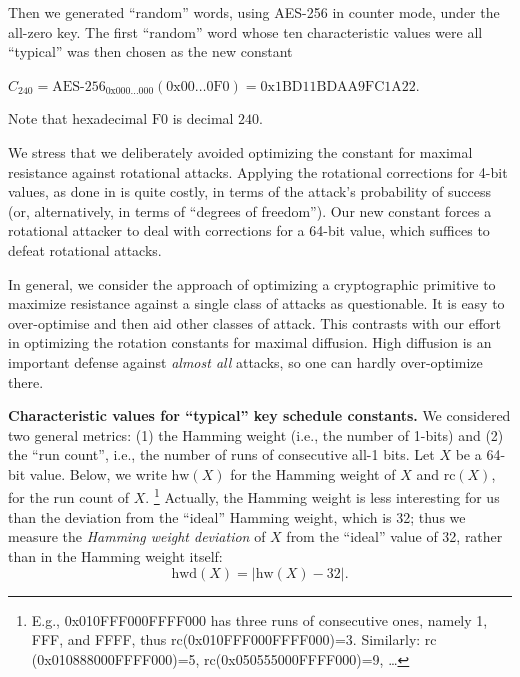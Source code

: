\documentclass[11pt,twoside]{article}
\newcommand{\TheConst}{C_{240}} %
\begin{document}
Then we generated ``random'' words, using AES-256 in counter
mode, under the all-zero key. The first ``random'' word whose ten 
characteristic values were all 
``typical'' was then chosen as the new constant
\begin{center}
  $\TheConst=\text{AES-256}_{\text{0x000\ldots000}}(\text{0x00\ldots0F0})
            =\text{0x1BD11BDAA9FC1A22}$. 
\end{center}
Note that hexadecimal $\text{F0}$ is decimal $240$. 

We stress that we deliberately avoided optimizing the constant for maximal
resistance against rotational attacks. Applying the rotational corrections for
4-bit values, as done in \cite{KN10,RKN10} is quite costly, in terms of the
attack's probability of success (or, alternatively, in terms of ``degrees of
freedom''). Our new constant forces a rotational attacker to deal with 
corrections for a 64-bit value, which suffices to defeat rotational
attacks. 

In general, we consider the approach of optimizing a cryptographic
primitive to maximize resistance against a single class of attacks as
questionable. It is easy to over-optimise and then aid other
classes of attack.
This contrasts with our effort in optimizing the rotation constants for 
maximal diffusion. High diffusion is an important defense against 
\emph{almost all} attacks, so one can hardly over-optimize there.

{\bf Characteristic values for ``typical'' key schedule constants.}
We considered two general metrics: 
(1) the Hamming weight (i.e., the number of 1-bits) and
(2) the ``run count'', i.e., the number of runs of consecutive all-1 bits. 
Let $X$ be a 64-bit value. Below, we write $\mbox{hw}(X)$ for the Hamming
weight of $X$ and $\mbox{rc}(X)$, for the run count of $X$.%
    \footnote{E.g.,    0x010FFF000FFFF000 has three runs of consecutive ones,
      namely 1, FFF, and FFFF, 
      thus $\mbox{rc}$(0x010FFF000FFFF000)=3. Similarly:
           $\mbox{rc}$(0x010888000FFFF000)=5,
           $\mbox{rc}$(0x050555000FFFF000)=9, \ldots}
Actually, the Hamming weight is less interesting for us than the deviation
from the ``ideal'' Hamming weight, which is 32; thus we measure the 
\emph{Hamming weight deviation} of $X$ from the
``ideal'' value of 32, rather than in the Hamming weight itself: 
  \[ \mbox{hwd}(X) = \left|\mbox{hw}(X)-32\right|. \]
\end{document}
